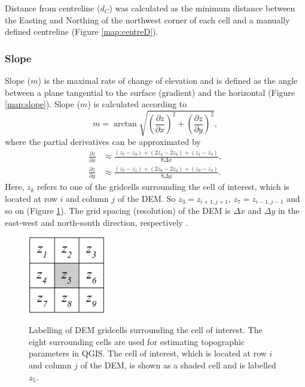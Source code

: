 \documentclass{sfuthesis}
\begin{document}
Distance from centreline ($d_C$) was calculated as the minimum distance between the Easting and Northing of the northwest corner of each cell and a manually defined centreline (Figure \ref{map:centreD}). 


\subsubsection*{Slope} 

Slope ($m$) is the maximal rate of change of elevation and is defined as the angle between a plane tangential to the surface (gradient) and the horizontal \citep{Olaya2009} (Figure \ref{map:slope}). Slope ($m$) is calculated according to 
\begin{equation}
m = \arctan \sqrt{\left( \frac{\partial z}{\partial x} \right) ^2 + \left( \frac{\partial z}{\partial y} \right) ^2},
\end{equation}
where the partial derivatives can be approximated by \citep{Mitavsova1993, Neteler2008, Hofierka2009}
\begin{align} \label{eq:firstpartial}
\frac{\partial z}{\partial x} &\approx \frac{(z_7-z_9)+(2z_4-2z_6)+(z_1-z_3)}{8  \Delta x},\nonumber \\
\frac{\partial z}{\partial y} &\approx \frac{(z_7-z_1)+(2z_8-2z_2)+(z_9-z_3)}{8  \Delta y}.
\end{align}
Here, $z_k$ refers to one of the gridcells surrounding the cell of interest, which is located at row $i$ and column $j$ of the DEM. So $z_3 = z_{i+1,j+1}$, $z_7 = z_{i-1,j-1}$ and so on (Figure \ref{fig:DEMgrid}). The grid spacing (resolution) of the DEM is $\Delta x$ and $\Delta y$ in the east-west and north-south direction, respectively \citep{Neteler2008}. 

\begin{figure}[H]
	\centering
	\includegraphics[width = 0.3\textwidth]{DEMGrid.png}\\
	\caption{Labelling of DEM gridcells surrounding the cell of interest. The eight surrounding cells are used for estimating topographic parameters in QGIS. The cell of interest, which is located at row $i$ and column $j$ of the DEM, is shown as a shaded cell and is labelled $z_5$.}
	\label{fig:DEMgrid}
\end{figure}
\end{document}

